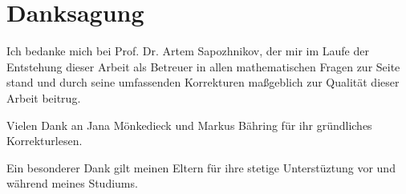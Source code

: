 
\chapter*{Danksagung}
Ich bedanke mich bei Prof. Dr. Artem Sapozhnikov,
der mir im Laufe der Entstehung dieser Arbeit als Betreuer in allen mathematischen Fragen zur Seite stand
und durch seine umfassenden Korrekturen maßgeblich zur Qualität dieser Arbeit beitrug.

Vielen Dank an Jana Mönkedieck und Markus Bähring für ihr gründliches Korrekturlesen.

Ein besonderer Dank gilt meinen Eltern für ihre stetige Unterstüztung vor und während meines Studiums.